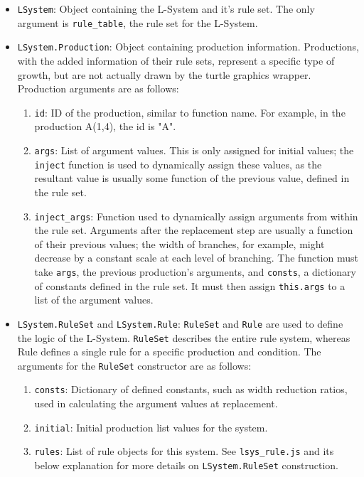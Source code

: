 \documentclass{article}
\begin{document}
\begin{itemize}
    \item \verb|LSystem|: Object containing the L-System and it's rule set. The only argument is
\verb|rule_table|, the rule set for the L-System.
    \item \verb|LSystem.Production|: Object containing production information. Productions, with
the added information of their rule sets, represent a specific type of growth, but are not actually
drawn by the turtle graphics wrapper. Production arguments are as follows:
    \begin{enumerate}
        \item \verb|id|: ID of the production, similar to function name. For example, in the
production A(1,4), the id is "A".
        \item \verb|args|: List of argument values. This is only assigned for initial values; the
\verb|inject| function is used to dynamically assign these values, as the resultant value is
usually some function of the previous value, defined in the rule set.
        \item \verb|inject_args|: Function used to dynamically assign arguments from within the
rule set. Arguments after the replacement step are usually a function of their previous values;
the width of branches, for example, might decrease by a constant scale at each level of branching.
The function must take \verb|args|, the previous production's arguments, and \verb|consts|, a
dictionary of constants defined in the rule set. It must then assign \verb|this.args| to a list of
the argument values.

    \end{enumerate}
    \item \verb|LSystem.RuleSet| and \verb|LSystem.Rule|: \verb|RuleSet| and \verb|Rule| are used
to define the logic of the L-System. \verb|RuleSet| describes the entire rule system, whereas Rule
defines a single rule for a specific production and condition. The arguments for the \verb|RuleSet|
constructor are as follows:
    \begin{enumerate}
        \item \verb|consts|: Dictionary of defined constants, such as width reduction ratios, used
    in calculating the argument values at replacement.
        \item \verb|initial|: Initial production list values for the system.
        \item \verb|rules|: List of rule objects for this system.
See \verb|lsys_rule.js| and its below explanation for more details on \verb|LSystem.RuleSet|
construction.


\end{enumerate}
\end{itemize}
\end{document}
